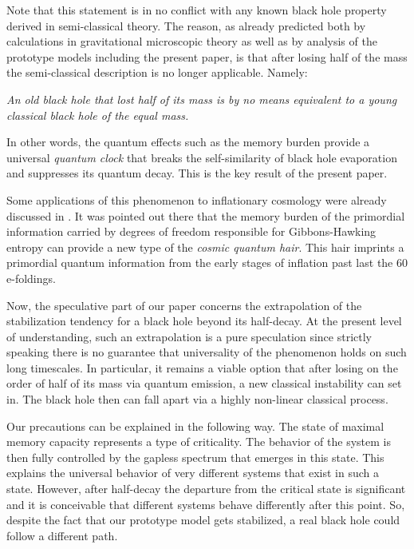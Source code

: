 \documentclass[aps,prd,reprint,superscriptaddress,nofootinbib]{revtex4-2}
\begin{document}
 Note that this statement is in no conflict with any known 
 black hole property derived in semi-classical theory. 
 The reason, as already predicted both by calculations in
 gravitational microscopic theory  \cite{Dvali:2013eja,Dvali:2012rt,Dvali:2012wq,Dvali:2013vxa,Dvali:2017eba} as well as by 
 analysis of the prototype models \cite{1207.4059, 1507.02948,1507.08952, 
1601.01329, 1711.09079,1801.03918, 1712.02233, 1805.10292, 1810.02336, 1812.08749, 1906.03530, 1907.07332, 2003.05546} 
 including the present paper, is that after losing half of the  
 mass the semi-classical description is no longer applicable. 
 Namely:
 
{\it An old black hole that lost half of its mass is by no means
	equivalent to a young  classical black hole of the equal mass. } 
 
 In other words, the quantum effects such as the memory burden provide a universal {\it quantum clock }  
 that breaks the self-similarity of black hole evaporation 
 and suppresses its quantum decay. 
 This is the key result of the present paper.
 
 
 Some applications of this phenomenon to inflationary cosmology were already 
  discussed in \cite{1812.08749}. It was pointed out there that the
  memory burden of the primordial information carried  
  by degrees of freedom responsible for Gibbons-Hawking 
  entropy \cite{PhysRev.D15.2738} can provide a new type of the {\it cosmic  quantum hair}. This hair imprints a primordial quantum 
information from the early stages of inflation past last the $60$ 
e-foldings. 
 
 Now, the speculative part of our paper concerns the extrapolation 
 of the stabilization tendency for a black hole 
  beyond its half-decay.   At the present level 
  of understanding, such an extrapolation is a pure speculation since
 strictly speaking there is no guarantee that
  universality of the phenomenon holds on such long timescales. 
    In particular, it remains a viable option that after losing on the order of half 
   of its mass via quantum emission, a new classical instability can set in. 
   The black hole then can fall apart  via a highly non-linear 
   classical process.
  
 Our precautions can be explained in the following way.
  The state of maximal memory capacity represents a type of criticality. 
 The behavior of the system is then fully controlled by the gapless spectrum that 
  emerges in this state.
This explains the universal behavior of very different systems that 
 exist in such a state. 
  However, after half-decay the departure from the    
  critical state is significant and it is conceivable that different systems 
  behave differently after this point. So, despite the fact that 
  our prototype model gets stabilized, a real black hole
 could follow a different path.  
 
\end{document}
